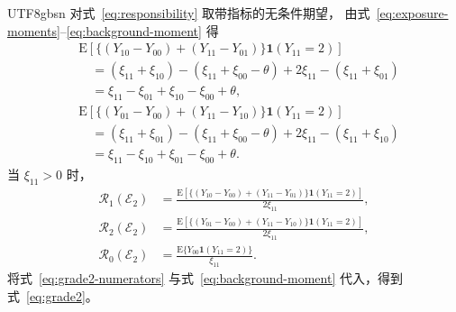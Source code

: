 \documentclass[11pt,a4paper]{article}
\theoremstyle{report}
\begin{document}
\begin{CJK*}{UTF8}{gbsn}
对式~\eqref{eq:responsibility} 取带指标的无条件期望，
由式~\eqref{eq:exposure-moments}--\eqref{eq:background-moment} 得
\begin{equation}
\begin{aligned}
&\mathrm E\!\left[\{(Y_{10}-Y_{00})+(Y_{11}-Y_{01})\}
                      \mathbf1(Y_{11}=2)\right]\\
&\quad=(\xi_{11}+\xi_{10})-(\xi_{11}+\xi_{00}-\theta)
          +2\xi_{11}-(\xi_{11}+\xi_{01})\\
&\quad=\xi_{11}-\xi_{01}+\xi_{10}-\xi_{00}+\theta,\\[4pt]
&\mathrm E\!\left[\{(Y_{01}-Y_{00})+(Y_{11}-Y_{10})\}
                      \mathbf1(Y_{11}=2)\right]\\
&\quad=(\xi_{11}+\xi_{01})-(\xi_{11}+\xi_{00}-\theta)
          +2\xi_{11}-(\xi_{11}+\xi_{10})\\
&\quad=\xi_{11}-\xi_{10}+\xi_{01}-\xi_{00}+\theta.
\end{aligned}
\label{eq:grade2-numerators}
\end{equation}
当 $\xi_{11}>0$ 时，
\[
\begin{aligned}
\mathcal R_1(\mathcal E_2)
 &=\frac{\mathrm E[\{(Y_{10}-Y_{00})+(Y_{11}-Y_{01})\}
                          \mathbf1(Y_{11}=2)]}{2\xi_{11}},\\
\mathcal R_2(\mathcal E_2)
 &=\frac{\mathrm E[\{(Y_{01}-Y_{00})+(Y_{11}-Y_{10})\}
                          \mathbf1(Y_{11}=2)]}{2\xi_{11}},\\
\mathcal R_0(\mathcal E_2)
 &=\frac{\mathrm E\{Y_{00}\mathbf1(Y_{11}=2)\}}{\xi_{11}}.
\end{aligned}
\]
将式~\eqref{eq:grade2-numerators} 与式~\eqref{eq:background-moment} 代入，得到式~\eqref{eq:grade2}。


\end{CJK*}
\end{document}
